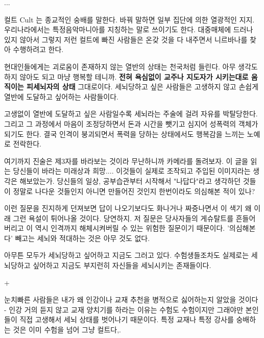 ...
\vspace{5mm}

컬트 Cult 는 종교적인 숭배를 말한다. 바꿔 말하면 일부 집단에 의한 열광적인 지지.
우리나라에서는 특정음악마니아를 지칭하는 말로 쓰이기도 한다.
대중매체에 드러나 있지 않아서 그렇지 저런 컬트에 빠진 사람들은 온갖 것을 다 내주면서 니르바나를 찾아 수행하려고 한다.
\vspace{5mm}

현대인들에게는 괴로움이 존재하지 않는 열반의 상태는 천국처럼 들린다.
아무 생각도 하지 않아도 되고 마냥 행복할 테니까.
\textbf{전혀 욕심없이 교주나 지도자가 시키는대로 움직이는 피세뇌자의 상태} 그대로이다.
세뇌당하고 싶은 사람들은 고생하지 않고 손쉽게 열반에 도달하고 싶어하는 사람들이다.
\vspace{5mm}

고생없이 열반에 도달하고 싶은 사람일수록 세뇌라는 주술에 걸려 자유를 박탈당한다.
그리고 그 과정에서 마음이 조정당하면서 돈과 시간을 뺏기고 심지어 성폭력의 객체가 되기도 한다.
결국 인격이 붕괴되면서 폭력을 당하는 상태에서도 행복감을 느끼는 노예로 전락한다.
\vspace{5mm}

여기까지 진술은 제3자를 바라보는 것이라 무난하니까 카메라를 돌려보자.
이 글을 읽는 당신들이 바라는 미래상과 희망.... 이것들이 실제로 조작되고 주입된 이미지라는 생각은 해보았는가.
당신들의 일상, 공부습관부터 시작해서 "나답다"라고 생각하던 것들이 정말로 나다운 것들인지
아니면 만들어진 것인지 한번이라도 의심해본 적이 있나?
\vspace{5mm}

이런 질문을 진지하게 던져보면 답이 나오기보다도 화나거나 짜증나면서 이 색기 왜 이래 그런 욕설이 튀어나올 것이다.
당연하지. 저 질문은 당사자들의 게슈탈트를 흔들어버리고 이 역시 인격까지 해체시켜버릴 수 있는 위험한 질문이기 때문이다.
'의심해본다' 빼고는 세뇌와 적대하는 것은 아무 것도 없다.
\vspace{5mm}

아무튼 모두가 세뇌당하고 싶어하고 지금도 그러고 있다.
수험생들조차도 실제로는 세뇌당하고 싶어하고 지금도 부지런히 자신들을 세뇌시키는 존재들이다.
\vspace{5mm}

+
\vspace{5mm}

눈치빠른 사람들은 내가 왜 인강이나 교재 추천을 병적으로 싫어하는지 알았을 것이다 -
인강 거의 듣지 않고 교재 양치기를 하라는 이유는 수험도 수험이지만 그래야만 본인들이 직접 고생해서 세뇌 상태를 벗어나기 때문이다.
특정 교재나 특정 강사를 숭배하는 것은 이미 수험을 넘어 그냥 컬트다,.
\vspace{5mm}






